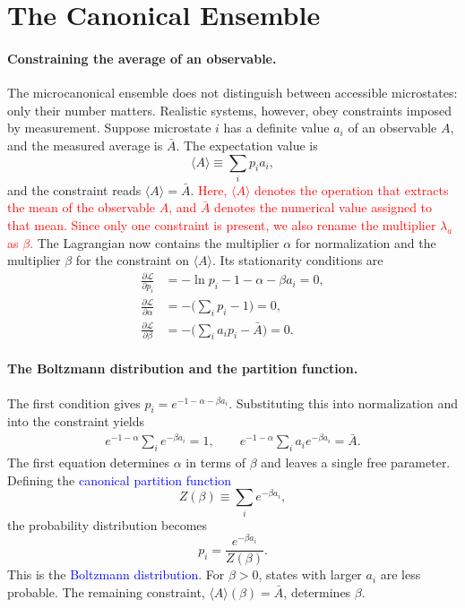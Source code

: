 \section{The Canonical Ensemble}

\paragraph{Constraining the average of an observable.}
The microcanonical ensemble does not distinguish between accessible
microstates: only their number matters. Realistic systems, however, obey
constraints imposed by measurement. Suppose microstate $i$ has a definite
value $a_i$ of an observable $A$, and the measured average is $\bar A$. The
expectation value is
\begin{equation}
    \boxed{\langle A\rangle \equiv \sum_i p_i a_i,}
\end{equation}
and the constraint reads $\langle A\rangle=\bar A$.
\textcolor{red}{Here, $\langle A\rangle$ denotes the operation that extracts
the mean of the observable $A$, and $\bar A$ denotes the numerical value
assigned to that mean. Since only one constraint is present, we also rename
the multiplier $\lambda_a$ as $\beta$.}
The Lagrangian now contains the multiplier $\alpha$ for normalization and
the multiplier $\beta$ for the constraint on $\langle A\rangle$. Its
stationarity conditions are
\begin{align*}
    \frac{\partial\mathcal{L}}{\partial p_i}
    &= -\ln p_i-1-\alpha-\beta a_i=0, \\
    \frac{\partial\mathcal{L}}{\partial\alpha}
    &= -\Big(\sum_i p_i-1\Big)=0, \\
    \frac{\partial\mathcal{L}}{\partial\beta}
    &= -\Big(\sum_i a_i p_i-\bar A\Big)=0.
\end{align*}

\paragraph{The Boltzmann distribution and the partition function.}
The first condition gives $p_i = e^{-1-\alpha-\beta a_i}$. Substituting this
into normalization and into the constraint yields
\begin{align*}
    e^{-1-\alpha}\sum_i e^{-\beta a_i} = 1,
    \qquad
    e^{-1-\alpha}\sum_i a_i e^{-\beta a_i} = \bar A.
\end{align*}
The first equation determines $\alpha$ in terms of $\beta$ and leaves a
single free parameter. Defining the \textcolor{blue}{canonical partition
function}
\begin{equation}
    \boxed{Z(\beta) \equiv \sum_i e^{-\beta a_i},}
\end{equation}
the probability distribution becomes
\begin{equation}
    \boxed{p_i = \frac{e^{-\beta a_i}}{Z(\beta)}.}
\end{equation}
This is the \textcolor{blue}{Boltzmann distribution}. For $\beta>0$, states
with larger $a_i$ are less probable. The remaining constraint,
$\langle A\rangle(\beta)=\bar A$, determines $\beta$.

